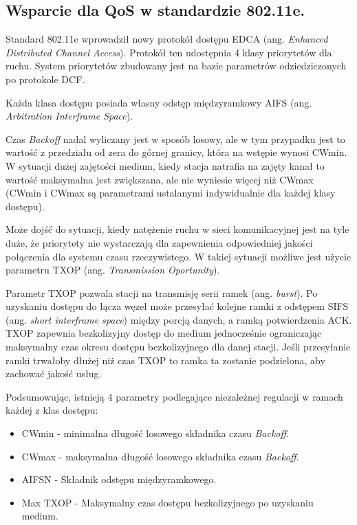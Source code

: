 \subsection{Wsparcie dla QoS w standardzie 802.11e.}

Standard 802.11e wprowadził nowy protokół dostępu EDCA (ang. \emph{Enhanced Distributed Channel Access}). Protokół ten udostępnia 4 klasy priorytetów dla ruchu. System priorytetów zbudowany jest na bazie parametrów odziedziczonych po protokole DCF. 

Każda klasa dostępu posiada własny odstęp międzyramkowy AIFS (ang. \emph{Arbitration Interframe Space}).

Czas \emph{Backoff} nadal wyliczany jest w sposób losowy, ale w tym przypadku jest to wartość z przedziału od zera do górnej granicy, która na wstępie wynosi CWmin. W sytuacji dużej zajętości medium, kiedy stacja natrafia na zajęty kanał to wartość maksymalna jest zwiększana, ale nie wyniesie więcej niż CWmax (CWmin i CWmax są parametrami ustalanymi indywidualnie dla każdej klasy dostępu).

Może dojść do sytuacji, kiedy natężenie ruchu w sieci komunikacyjnej jest na tyle duże, że priorytety nie wystarczają dla zapewnienia odpowiedniej jakości połączenia dla systemu czasu rzeczywistego. W takiej sytuacji możliwe jest użycie parametru TXOP (ang. \emph{Transmission Oportunity}). 

Parametr TXOP pozwala stacji na transmisję serii ramek (ang. \emph{burst}). Po uzyskaniu dostępu do łącza
węzeł może przesyłać kolejne ramki z odstępem SIFS (ang. \emph{short interframe space}) między porcją danych, a
ramką potwierdzenia ACK. TXOP zapewnia bezkolizyjny dostęp do medium jednocześnie ograniczając maksymalny czas 
okresu dostępu bezkolizyjnego dla danej stacji. Jeśli przesyłanie ramki trwałoby dłużej niż czas TXOP to ramka
ta zostanie podzielona, aby zachować jakość usług.

Podsumowując, istnieją 4 parametry podlegające niezależnej regulacji w ramach każdej z klas dostępu:

\begin{itemize}
\item CWmin - minimalna długość losowego składnika czasu \emph{Backoff}.
\item CWmax - maksymalna długość losowego składnika czasu \emph{Backoff}.
\item AIFSN - Składnik odstępu międzyramkowego. 
\item Max TXOP - Maksymalny czas dostępu bezkolizyjnego po uzyskaniu medium.
\end{itemize}

